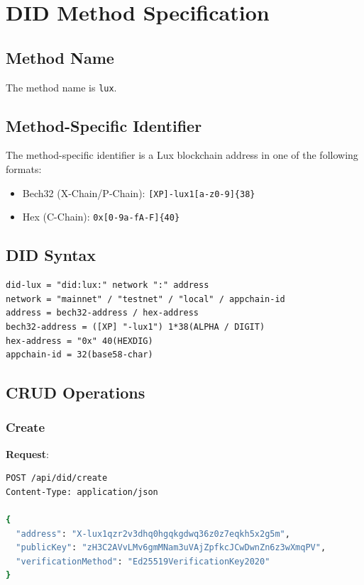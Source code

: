 \documentclass[11pt,a4paper]{article}
\begin{document}
\appendix

\section{DID Method Specification}

\subsection{Method Name}

The method name is \texttt{lux}.

\subsection{Method-Specific Identifier}

The method-specific identifier is a Lux blockchain address in one of the following formats:

\begin{itemize}
  \item Bech32 (X-Chain/P-Chain): \texttt{[XP]-lux1[a-z0-9]\{38\}}
  \item Hex (C-Chain): \texttt{0x[0-9a-fA-F]\{40\}}
\end{itemize}

\subsection{DID Syntax}

\begin{verbatim}
did-lux = "did:lux:" network ":" address
network = "mainnet" / "testnet" / "local" / appchain-id
address = bech32-address / hex-address
bech32-address = ([XP] "-lux1") 1*38(ALPHA / DIGIT)
hex-address = "0x" 40(HEXDIG)
appchain-id = 32(base58-char)
\end{verbatim}

\subsection{CRUD Operations}

\subsubsection{Create}

\textbf{Request}:
\begin{lstlisting}[language=bash]
POST /api/did/create
Content-Type: application/json

{
  "address": "X-lux1qzr2v3dhq0hgqkgdwq36z0z7eqkh5x2g5m",
  "publicKey": "zH3C2AVvLMv6gmMNam3uVAjZpfkcJCwDwnZn6z3wXmqPV",
  "verificationMethod": "Ed25519VerificationKey2020"
}
\end{lstlisting}
\end{document}
